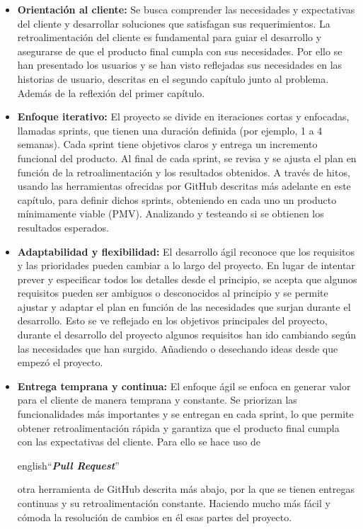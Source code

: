 \begin{itemize}
\item \textbf{Orientación al cliente:} Se busca comprender las necesidades y expectativas del cliente y desarrollar soluciones que satisfagan sus requerimientos. La retroalimentación del cliente es fundamental para guiar el desarrollo y asegurarse de que el producto final cumpla con sus necesidades.
Por ello se han presentado los usuarios y se han visto reflejadas sus necesidades en las historias de usuario, descritas en el segundo capítulo junto al problema. Además de la reflexión del primer capítulo.

\item \textbf{Enfoque iterativo:} El proyecto se divide en iteraciones cortas y enfocadas, llamadas sprints, que tienen una duración definida (por ejemplo, 1 a 4 semanas). Cada sprint tiene objetivos claros y entrega un incremento funcional del producto. Al final de cada sprint, se revisa y se ajusta el plan en función de la retroalimentación y los resultados obtenidos.
A través de hitos, usando las herramientas ofrecidas por GitHub descritas más adelante en este capítulo, para definir dichos sprints, obteniendo en cada uno un producto mínimamente viable (PMV). Analizando y testeando si se obtienen los resultados esperados.

\item \textbf{Adaptabilidad y flexibilidad:} El desarrollo ágil reconoce que los requisitos y las prioridades pueden cambiar a lo largo del proyecto. En lugar de intentar prever y especificar todos los detalles desde el principio, se acepta que algunos requisitos pueden ser ambiguos o desconocidos al principio y se permite ajustar y adaptar el plan en función de las necesidades que surjan durante el desarrollo.
Esto se ve reflejado en los objetivos principales del proyecto, durante el desarrollo del proyecto algunos requisitos han ido cambiando según las necesidades que han surgido. Añadiendo o desechando ideas desde que empezó el proyecto.

\item \textbf{Entrega temprana y continua:} El enfoque ágil se enfoca en generar valor para el cliente de manera temprana y constante. Se priorizan las funcionalidades más importantes y se entregan en cada sprint, lo que permite obtener retroalimentación rápida y garantiza que el producto final cumpla con las expectativas del cliente.
Para ello se hace uso de \begin{otherlanguage}
{english}``\textit{\textbf{Pull Request}}''\end{otherlanguage} otra herramienta de GitHub descrita más abajo, por la que se tienen entregas continuas y su retroalimentación constante. Haciendo mucho más fácil y cómoda la resolución de cambios en él esas partes del proyecto.

\end{itemize}


